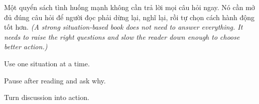 \vspace{6pt}

\begin{baihoc}
Một quyển sách tình huống mạnh không cần trả lời mọi câu hỏi ngay. Nó cần mở đủ đúng câu hỏi để người đọc phải dừng lại, nghĩ lại, rồi tự chọn cách hành động tốt hơn.
\textit{(A strong situation-based book does not need to answer everything. It needs to raise the right questions and slow the reader down enough to choose better action.)}
\end{baihoc}

\begin{ghinhoanh}
Use one situation at a time.

Pause after reading and ask why.

Turn discussion into action.
\end{ghinhoanh}

\ngancach
